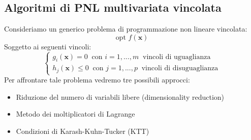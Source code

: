 \documentclass[12pt]{article}
\begin{document}
\subsection{Algoritmi di PNL multivariata vincolata}
Consideriamo un generico problema di programmazione non lineare vincolata:
$$\textrm{opt } f(\boldsymbol{x})$$
Soggetto ai seguenti vincoli:
$$\begin{cases}
    g_i(\boldsymbol{x}) = 0 \; \; \textrm{con } i = 1,...,m \; \;  \textrm{vincoli di uguaglianza} \\
    h_j(\boldsymbol{x}) \leq 0 \; \;  \textrm{con } j = 1,...,p \; \;  \textrm{vincoli di disuguaglianza}
\end{cases}$$
Per affrontare tale problema vedremo tre possibili approcci:
\begin{itemize}
    \item Riduzione del numero di variabili libere (dimensionality reduction)
    \item Metodo dei moltiplicatori di Lagrange
    \item Condizioni di Karash-Kuhn-Tucker (KTT)
\end{itemize}
\end{document}

